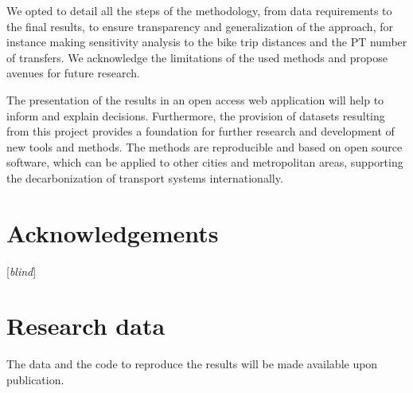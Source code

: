\documentclass[review, doubleblind, 3p,
authoryear]{elsarticle} %
\begin{document}
We opted to detail all the steps of the methodology, from data
requirements to the final results, to ensure transparency and
generalization of the approach, for instance making sensitivity analysis
to the bike trip distances and the PT number of transfers. We
acknowledge the limitations of the used methods and propose avenues for
future research.

The presentation of the results in an open access web application will
help to inform and explain decisions. Furthermore, the provision of
datasets resulting from this project provides a foundation for further
research and development of new tools and methods. The methods are
reproducible and based on open source software, which can be applied to
other cities and metropolitan areas, supporting the decarbonization of
transport systems internationally.

\section*{Acknowledgements}\label{acknowledgements}

{[}\emph{blind}{]}

\section*{Research data}\label{research-data}

The data and the code to reproduce the results will be made available
upon publication.

\renewcommand\refname{References}

\end{document}
